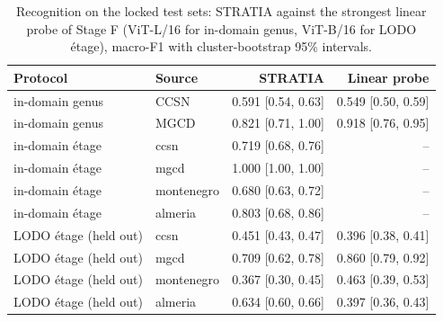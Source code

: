 \begin{table}[t]
\centering
\footnotesize
\begin{tabular}{llrr}
\toprule
Protocol & Source & STRATIA & Linear probe \\
\midrule
in-domain genus & CCSN & 0.591 [0.54, 0.63] & 0.549 [0.50, 0.59] \\
in-domain genus & MGCD & 0.821 [0.71, 1.00] & 0.918 [0.76, 0.95] \\
in-domain étage & ccsn & 0.719 [0.68, 0.76] & – \\
in-domain étage & mgcd & 1.000 [1.00, 1.00] & – \\
in-domain étage & montenegro & 0.680 [0.63, 0.72] & – \\
in-domain étage & almeria & 0.803 [0.68, 0.86] & – \\
LODO étage (held out) & ccsn & 0.451 [0.43, 0.47] & 0.396 [0.38, 0.41] \\
LODO étage (held out) & mgcd & 0.709 [0.62, 0.78] & 0.860 [0.79, 0.92] \\
LODO étage (held out) & montenegro & 0.367 [0.30, 0.45] & 0.463 [0.39, 0.53] \\
LODO étage (held out) & almeria & 0.634 [0.60, 0.66] & 0.397 [0.36, 0.43] \\
\bottomrule
\end{tabular}
\caption{Recognition on the locked test sets: STRATIA against the strongest linear probe of Stage F (ViT-L/16 for in-domain genus, ViT-B/16 for LODO étage), macro-F1 with cluster-bootstrap 95\% intervals.}
\label{tab:recognition}
\end{table}
